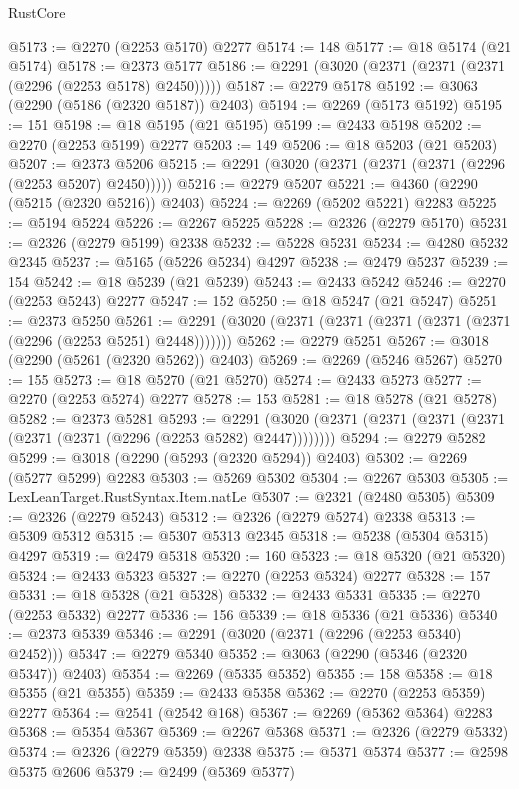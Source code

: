\begin{lexlean}{RustCore}
\begin{coremodule}
@5173 := @2270 (@2253 @5170) @2277
@5174 := 148
@5177 := @18 @5174 (@21 @5174)
@5178 := @2373 @5177
@5186 := @2291 (@3020 (@2371 (@2371 (@2371 (@2296 (@2253 @5178) @2450)))))
@5187 := @2279 @5178
@5192 := @3063 (@2290 (@5186 (@2320 @5187)) @2403)
@5194 := @2269 (@5173 @5192)
@5195 := 151
@5198 := @18 @5195 (@21 @5195)
@5199 := @2433 @5198
@5202 := @2270 (@2253 @5199) @2277
@5203 := 149
@5206 := @18 @5203 (@21 @5203)
@5207 := @2373 @5206
@5215 := @2291 (@3020 (@2371 (@2371 (@2371 (@2296 (@2253 @5207) @2450)))))
@5216 := @2279 @5207
@5221 := @4360 (@2290 (@5215 (@2320 @5216)) @2403)
@5224 := @2269 (@5202 @5221) @2283
@5225 := @5194 @5224
@5226 := @2267 @5225
@5228 := @2326 (@2279 @5170)
@5231 := @2326 (@2279 @5199) @2338
@5232 := @5228 @5231
@5234 := @4280 @5232 @2345
@5237 := @5165 (@5226 @5234) @4297
@5238 := @2479 @5237
@5239 := 154
@5242 := @18 @5239 (@21 @5239)
@5243 := @2433 @5242
@5246 := @2270 (@2253 @5243) @2277
@5247 := 152
@5250 := @18 @5247 (@21 @5247)
@5251 := @2373 @5250
@5261 := @2291 (@3020 (@2371 (@2371 (@2371 (@2371 (@2371 (@2296 (@2253 @5251) @2448)))))))
@5262 := @2279 @5251
@5267 := @3018 (@2290 (@5261 (@2320 @5262)) @2403)
@5269 := @2269 (@5246 @5267)
@5270 := 155
@5273 := @18 @5270 (@21 @5270)
@5274 := @2433 @5273
@5277 := @2270 (@2253 @5274) @2277
@5278 := 153
@5281 := @18 @5278 (@21 @5278)
@5282 := @2373 @5281
@5293 := @2291 (@3020 (@2371 (@2371 (@2371 (@2371 (@2371 (@2371 (@2296 (@2253 @5282) @2447))))))))
@5294 := @2279 @5282
@5299 := @3018 (@2290 (@5293 (@2320 @5294)) @2403)
@5302 := @2269 (@5277 @5299) @2283
@5303 := @5269 @5302
@5304 := @2267 @5303
@5305 := LexLeanTarget.RustSyntax.Item.natLe
@5307 := @2321 (@2480 @5305)
@5309 := @2326 (@2279 @5243)
@5312 := @2326 (@2279 @5274) @2338
@5313 := @5309 @5312
@5315 := @5307 @5313 @2345
@5318 := @5238 (@5304 @5315) @4297
@5319 := @2479 @5318
@5320 := 160
@5323 := @18 @5320 (@21 @5320)
@5324 := @2433 @5323
@5327 := @2270 (@2253 @5324) @2277
@5328 := 157
@5331 := @18 @5328 (@21 @5328)
@5332 := @2433 @5331
@5335 := @2270 (@2253 @5332) @2277
@5336 := 156
@5339 := @18 @5336 (@21 @5336)
@5340 := @2373 @5339
@5346 := @2291 (@3020 (@2371 (@2296 (@2253 @5340) @2452)))
@5347 := @2279 @5340
@5352 := @3063 (@2290 (@5346 (@2320 @5347)) @2403)
@5354 := @2269 (@5335 @5352)
@5355 := 158
@5358 := @18 @5355 (@21 @5355)
@5359 := @2433 @5358
@5362 := @2270 (@2253 @5359) @2277
@5364 := @2541 (@2542 @168)
@5367 := @2269 (@5362 @5364) @2283
@5368 := @5354 @5367
@5369 := @2267 @5368
@5371 := @2326 (@2279 @5332)
@5374 := @2326 (@2279 @5359) @2338
@5375 := @5371 @5374
@5377 := @2598 @5375 @2606
@5379 := @2499 (@5369 @5377)

\end{coremodule}
\end{lexlean}
